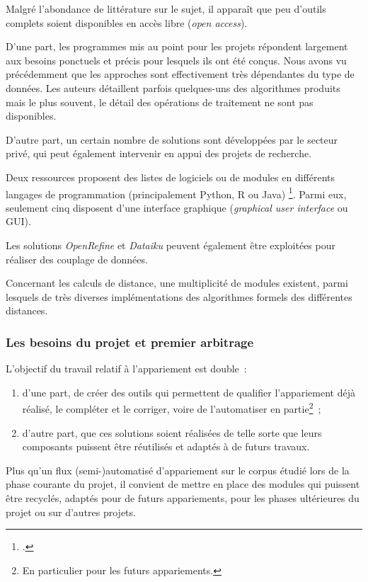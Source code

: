 \documentclass[a4paper,12pt,twoside]{book}
\begin{document}
        	        Malgré l'abondance de littérature sur le sujet, il apparaît que peu d'outils complets soient disponibles en accès libre (\textit{open access}).
        	        
        	        D'une part, les programmes mis au point pour les projets répondent largement aux besoins ponctuels et précis pour lesquels ils ont été conçus. Nous avons vu précédemment que les approches sont effectivement très dépendantes du type de données. Les auteurs détaillent parfois quelques-uns des algorithmes produits mais le plus souvent, le détail des opérations de traitement ne sont pas disponibles.
        	        
        	        D'autre part, un certain nombre de solutions sont développées par le secteur privé, qui peut également intervenir en appui des projets de recherche.
        	        
        	        Deux ressources proposent des listes de logiciels ou de modules en différents langages de programmation (principalement Python, R ou Java) \footcites{DatamatchingsoftwareListFree,ropeladderRecordLinkageResources2022}. Parmi eux, seulement cinq disposent d'une interface graphique (\textit{graphical user interface} ou GUI).
        	        
        	        Les solutions \textit{OpenRefine} et \textit{Dataiku} peuvent également être exploitées pour réaliser des couplage de données.
        	        
        	        Concernant les calculs de distance, une multiplicité de modules existent, parmi lesquels de très diverses implémentations des algorithmes formels des différentes distances.
	            
	            \subsubsection{Les besoins du projet et premier arbitrage}
	            
	                L'objectif du travail relatif à l'appariement est double~:
	               \vspace{0.8em} 
	               \begin{enumerate}
	                   \item d'une part, de créer des outils qui permettent de qualifier l'appariement déjà réalisé, le compléter et le corriger, voire de l'automatiser en partie\footnote{En particulier pour les futurs appariements.}~;
	                   \item d'autre part, que ces solutions soient réalisées de telle sorte que leurs composants puissent être réutilisés et adaptés à de futurs travaux.
	               \end{enumerate}
	               \vspace{0.8em}
	               Plus qu'un flux (semi-)automatisé d'appariement sur le corpus étudié lors de la phase courante du projet, il convient de mettre en place des modules qui puissent être recyclés, adaptés pour de futurs appariements, pour les phases ultérieures du projet ou sur d'autres projets.
	               
\end{document}
